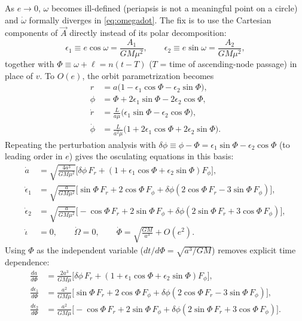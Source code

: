 \documentclass[11pt]{article}
\newcommand{\vecA}{\vec A}
\begin{document}
As $e\to0$, $\omega$ becomes ill-defined (periapsis is not a meaningful point on a circle) and $\dot\omega$ formally diverges in \eqref{eq:omegadot}. The fix is to use the Cartesian components of $\vecA$ directly instead of its polar decomposition:
\begin{equation}
\epsilon_1 \equiv e\cos\omega = \frac{A_1}{GM\mu^2},\qquad \epsilon_2\equiv e\sin\omega=\frac{A_2}{GM\mu^2}, \label{eq:LL_vars}
\end{equation}
together with $\Phi\equiv\omega+\ell = n(t-T)$ ($T$ = time of ascending-node passage) in place of $v$. To $O(e)$, the orbit parametrization becomes
\begin{align}
r &= a\big(1-\epsilon_1\cos\Phi-\epsilon_2\sin\Phi\big), \label{eq:r_LL}\\
\phi &= \Phi + 2\epsilon_1\sin\Phi - 2\epsilon_2\cos\Phi, \label{eq:phi_LL}\\
\dot r &= \frac{L}{a\mu}\big(\epsilon_1\sin\Phi-\epsilon_2\cos\Phi\big), \label{eq:rdot_LL}\\
\dot\phi &= \frac{L}{a^2\mu}\big(1+2\epsilon_1\cos\Phi+2\epsilon_2\sin\Phi\big). \label{eq:phidot_LL}
\end{align}
Repeating the perturbation analysis with $\delta\phi\equiv\phi-\Phi=\epsilon_1\sin\Phi-\epsilon_2\cos\Phi$ (to leading order in $e$) gives the osculating equations in this basis:
\begin{align}
\dot a &= \sqrt{\frac{4a^3}{GM\mu^2}}\Big[\delta\phi\,F_r + (1+\epsilon_1\cos\Phi+\epsilon_2\sin\Phi)F_\phi\Big], \label{eq:adot_LL}\\
\dot\epsilon_1 &= \sqrt{\frac{a}{GM\mu^2}}\Big[\sin\Phi\,F_r+2\cos\Phi\,F_\phi+\delta\phi(2\cos\Phi\,F_r-3\sin\Phi\,F_\phi)\Big], \label{eq:eps1dot}\\
\dot\epsilon_2 &= \sqrt{\frac{a}{GM\mu^2}}\Big[-\cos\Phi\,F_r+2\sin\Phi\,F_\phi+\delta\phi(2\sin\Phi\,F_r+3\cos\Phi\,F_\phi)\Big], \label{eq:eps2dot}\\
\dot\iota&=0,\qquad \dot\Omega=0,\qquad
\dot\Phi = \sqrt{\frac{GM}{a^3}}+O(e^2). \label{eq:Phidot_LL}
\end{align}
Using $\Phi$ as the independent variable ($dt/d\Phi=\sqrt{a^3/GM}$) removes explicit time dependence:
\begin{align}
\frac{da}{d\Phi} &= \frac{2a^3}{GM\mu}\Big[\delta\phi\,F_r+(1+\epsilon_1\cos\Phi+\epsilon_2\sin\Phi)F_\phi\Big], \label{eq:dadPhi}\\
\frac{d\epsilon_1}{d\Phi} &= \frac{a^2}{GM\mu}\Big[\sin\Phi\,F_r+2\cos\Phi\,F_\phi+\delta\phi(2\cos\Phi\,F_r-3\sin\Phi\,F_\phi)\Big], \label{eq:deps1dPhi}\\
\frac{d\epsilon_2}{d\Phi} &= \frac{a^2}{GM\mu}\Big[-\cos\Phi\,F_r+2\sin\Phi\,F_\phi+\delta\phi(2\sin\Phi\,F_r+3\cos\Phi\,F_\phi)\Big]. \label{eq:deps2dPhi}
\end{align}
\end{document}

